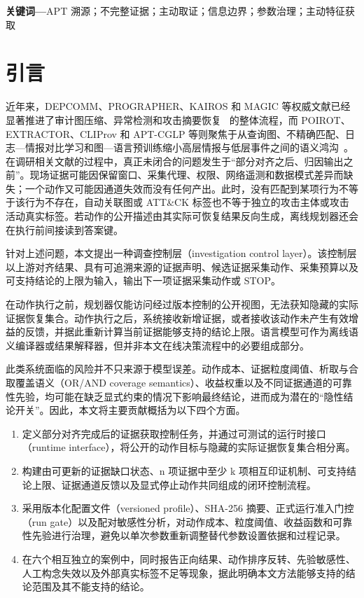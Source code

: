 \documentclass[UTF8,a4paper,twocolumn,zihao=5,fontset=fandol]{ctexart}
\begin{document}
\noindent\textbf{关键词—}APT 溯源；不完整证据；主动取证；信息边界；参数治理；主动特征获取

\section{引言}

近年来，DEPCOMM、PROGRAPHER、KAIROS 和 MAGIC 等权威文献已经显著推进了审计图压缩、异常检测和攻击摘要恢复~\cite{depcomm,prographer,kairos,magic} 的整体流程，而 POIROT、EXTRACTOR、CLIProv 和 APT-CGLP 等则聚焦于从查询图、不精确匹配、日志—情报对比学习和图—语言预训练缩小高层情报与低层事件之间的语义鸿沟~\cite{poirot,extractor,cliprov,aptcglp}。在调研相关文献的过程中，真正未闭合的问题发生于“部分对齐之后、归因输出之前”。现场证据可能因保留窗口、采集代理、权限、网络遥测和数据模式差异而缺失；一个动作又可能因通道失效而没有任何产出。此时，没有匹配到某项行为不等于该行为不存在，自动关联图或 ATT\&CK 标签也不等于独立的攻击主体或攻击活动真实标签。若动作的公开描述由其实际可恢复结果反向生成，离线规划器还会在执行前间接读到答案键。

针对上述问题，本文提出一种调查控制层（investigation control layer）。该控制层以上游对齐结果、具有可追溯来源的证据声明、候选证据采集动作、采集预算以及可支持结论的上限为输入，输出下一项证据采集动作或 STOP。

在动作执行之前，规划器仅能访问经过版本控制的公开视图，无法获知隐藏的实际证据恢复集合。动作执行之后，系统接收新增证据，或者接收该动作未产生有效增益的反馈，并据此重新计算当前证据能够支持的结论上限。语言模型可作为离线语义编译器或结果解释器，但并非本文在线决策流程中的必要组成部分。

此类系统面临的风险并不只来源于模型误差。动作成本、证据粒度阈值、析取与合取覆盖语义（OR/AND coverage semantics）、收益权重以及不同证据通道的可靠性先验，均可能在缺乏显式约束的情况下影响最终结论，进而成为潜在的“隐性结论开关”。因此，本文将主要贡献概括为以下四个方面。

\begin{enumerate}[label=(\arabic*),leftmargin=2.25em,itemsep=0pt,topsep=1pt,parsep=0pt]
  \item 定义部分对齐完成后的证据获取控制任务，并通过可测试的运行时接口（runtime interface），将公开的动作目标与隐藏的实际证据恢复集合相分离。
  \item 构建由可更新的证据缺口状态、n 项证据中至少 k 项相互印证机制、可支持结论上限、证据通道反馈以及显式停止动作共同组成的闭环控制流程。
  \item 采用版本化配置文件（versioned profile）、SHA-256 摘要、正式运行准入门控（run gate）以及配对敏感性分析，对动作成本、粒度阈值、收益函数和可靠性先验进行治理，避免以单次参数重新调整替代参数设置依据和过程记录。
  \item 在六个相互独立的案例中，同时报告正向结果、动作排序反转、先验敏感性、人工构念失效以及外部真实标签不足等现象，据此明确本文方法能够支持的结论范围及其不能支持的结论。
\end{enumerate}
\end{document}

